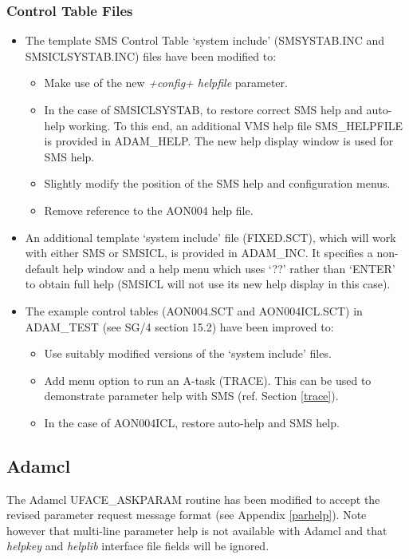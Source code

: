 \subsubsection{Control Table Files}
\begin{itemize}
\item The template SMS Control Table `system include' (SMSYSTAB.INC and
SMSICLSYSTAB.INC) files have been modified to:

\begin{itemize}
\item Make use of the new {\em +config+ helpfile} parameter.
\item In the case of SMSICLSYSTAB, to restore correct SMS help and auto-help
working.
To this end, an additional VMS help file SMS\_HELPFILE is provided in
ADAM\_HELP.
The new help display window is used for SMS help.
\item Slightly modify the position of the SMS help and configuration menus.
\item Remove reference to the AON004 help file.
\end{itemize}

\item An additional template `system include' file (FIXED.SCT),  which will 
work with either SMS or SMSICL, is provided in ADAM\_INC.
It specifies a non-default help window and a help menu which uses `??' rather
than `ENTER' to obtain full help (SMSICL will not use its new help display in
this case).

\item The example control tables (AON004.SCT and AON004ICL.SCT) in ADAM\_TEST
(see SG/4 section 15.2) have been improved to:
\begin{itemize}
\item Use suitably modified versions of the `system include' files.
\item Add menu option to run an A-task (TRACE).
This can be used to demonstrate parameter help with SMS (ref. Section
\ref{trace}).
\item In the case of AON004ICL, restore auto-help and SMS help.
\end{itemize}
\end{itemize}

\subsection{Adamcl}
The Adamcl UFACE\_ASKPARAM routine has been modified to accept the revised
parameter request message format (see Appendix \ref{parhelp}).
Note however that multi-line parameter help is not available with Adamcl and
that {\em helpkey} and {\em helplib} interface file fields will be ignored.

